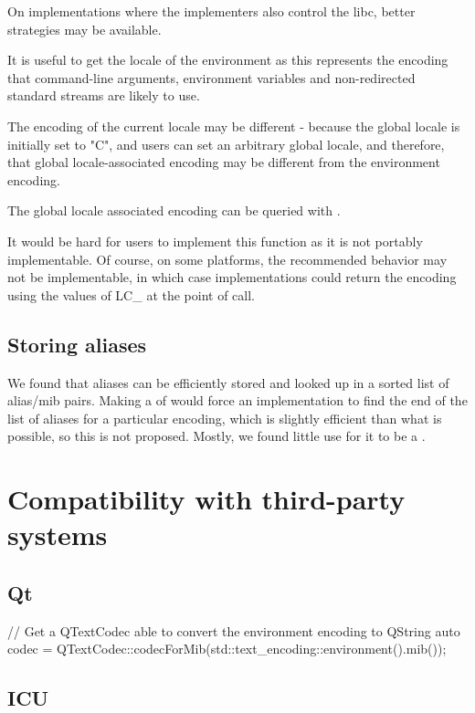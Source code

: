 \documentclass{wg21}
\begin{document}
On implementations where the implementers also control the libc, better strategies may be available.

It is useful to get the locale of the environment as this represents the encoding that command-line arguments,
environment variables and non-redirected standard streams are likely to use.

The encoding of the current locale may be different - because the global locale is initially set to "C", and users can set an arbitrary global locale, and therefore, that global locale-associated encoding may be different from the environment encoding.

The global locale associated encoding can be queried with .

It would be hard for users to implement this function as it is not portably implementable.
Of course, on some platforms, the recommended behavior may not be implementable, in which case implementations could return
the encoding using the values of LC_ at the point of call.

\subsection{Storing aliases}

We found that aliases can be efficiently stored and looked up in a sorted list of alias/mib pairs.
Making a  of  would force an implementation to find the end of the list
of aliases for a particular encoding, which is slightly efficient than what is possible, so this is not proposed.
Mostly, we found little use for it to be a .

\section{Compatibility with third-party systems}

\subsection{Qt}

\begin{colorblock}
// Get a QTextCodec able to convert the environment encoding to QString
auto codec = QTextCodec::codecForMib(std::text_encoding::environment().mib());
\end{colorblock}

\subsection{ICU}
\end{document}
